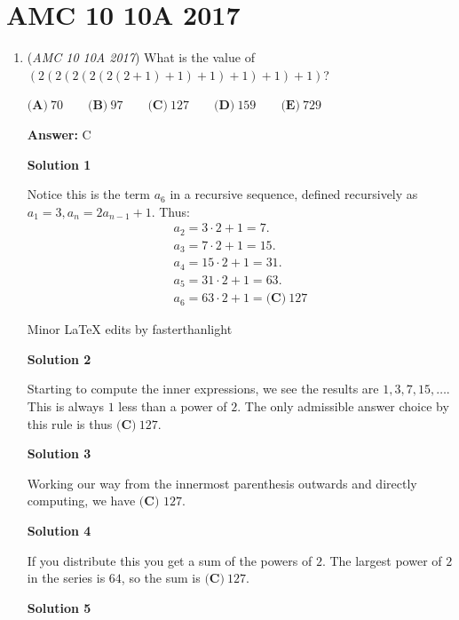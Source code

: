 \section{AMC 10 10A 2017}
        \begin{enumerate}
        	\item (\textit{AMC 10 10A 2017}) What is the value of $(2(2(2(2(2(2+1)+1)+1)+1)+1)+1)$?


 $\textbf{(A)}\ 70\qquad\textbf{(B)}\ 97\qquad\textbf{(C)}\ 127\qquad\textbf{(D)}\ 159\qquad\textbf{(E)}\ 729$

 \textbf{Answer: }C



\textbf{Solution 1}

Notice this is the term $a_6$ in a recursive sequence, defined recursively as $a_1 = 3, a_n = 2a_{n-1} + 1.$ Thus:
 \[\begin{split} a_2 = 3 \cdot 2 + 1 = 7.\\ a_3 = 7 \cdot 2 + 1 = 15.\\ a_4 = 15 \cdot 2 + 1 = 31.\\ a_5 = 31 \cdot 2 + 1 = 63.\\ a_6 = 63 \cdot 2 + 1 = \boxed{\textbf{(C)}\ 127} \end{split}\]

 Minor LaTeX edits by fasterthanlight

 



\textbf{Solution 2}

Starting to compute the inner expressions, we see the results are $1, 3, 7, 15, \ldots$. This is always $1$ less than a power of $2$. The only admissible answer choice by this rule is thus $\boxed{\textbf{(C)}\ 127}$.

 



\textbf{Solution 3}

Working our way from the innermost parenthesis outwards and directly computing, we have $\boxed{\textbf{(C) } 127}$.

 



\textbf{Solution 4}

If you distribute this you get a sum of the powers of $2$.  The largest power of $2$ in the series is $64$, so the sum is $\boxed{\textbf{(C)}\ 127}$.

 


 



\textbf{Solution 5}


\end{enumerate}
